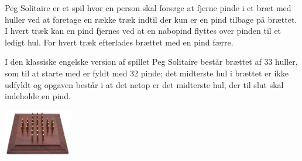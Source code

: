 Peg Solitaire er et spil hvor en person skal forsøge at fjerne pinde i
et bræt med huller ved at foretage en række træk indtil der kun er en
pind tilbage på brættet. I hvert træk kan en pind fjernes ved at en
nabopind flyttes over pinden til et ledigt hul. For hvert træk
efterlades brættet med en pind færre.

\begin{minipage}{.75\textwidth}
I den klassiske engelske version af spillet Peg Solitaire består
brættet af 33 huller, som til at starte med er fyldt med 32 pinde; det
midterste hul i brættet er ikke udfyldt og opgaven består i at det
netop er det midterste hul, der til slut skal indeholde en pind.
\end{minipage}
\begin{minipage}{.2\textwidth}
  \includegraphics[width=3cm]{solitaire.png}
\end{minipage}
